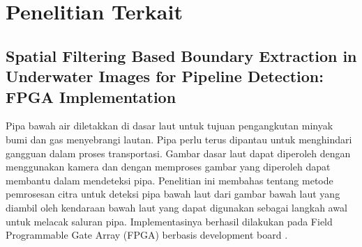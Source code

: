 






\section{Penelitian Terkait}
\subsection{Spatial Filtering Based Boundary Extraction in Underwater Images for Pipeline Detection: FPGA Implementation}
Pipa bawah air diletakkan di dasar laut untuk tujuan pengangkutan minyak bumi dan gas menyebrangi lautan. Pipa perlu terus dipantau untuk menghindari gangguan dalam proses transportasi. Gambar dasar laut dapat diperoleh dengan menggunakan kamera dan dengan memproses gambar yang diperoleh dapat membantu dalam mendeteksi pipa. Penelitian ini membahas tentang metode pemrosesan citra untuk deteksi pipa bawah laut dari gambar bawah laut yang diambil oleh kendaraan bawah laut yang dapat digunakan sebagai langkah awal untuk melacak saluran pipa. Implementasinya berhasil dilakukan pada Field Programmable Gate Array (FPGA) berbasis development board
.

